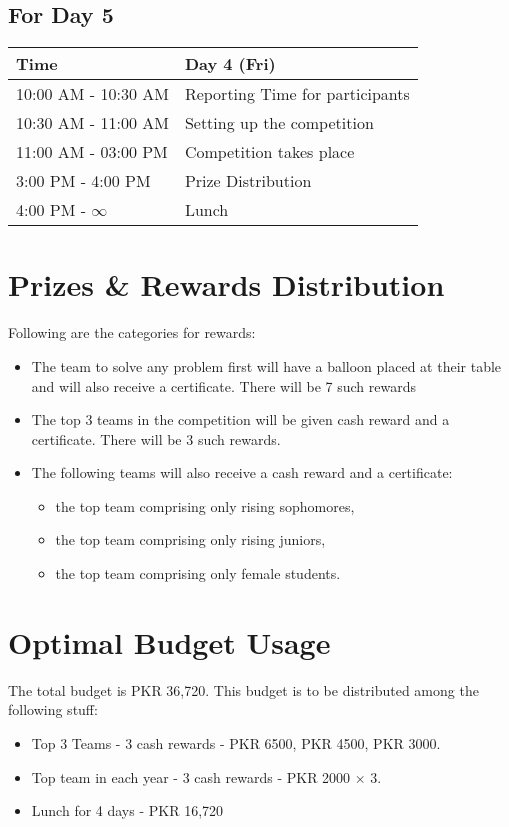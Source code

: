 \documentclass[12pt]{article}
\begin{document}
\subsection*{\centering For Day 5}
\begin{table}[H]
  \centering
  \begin{tabular}{|p{2.1cm}|p{12.9cm}|}
    \hline
    Time                & Day 4 (Fri)                     \\
    \hline
    10:00 AM - 10:30 AM & Reporting Time for participants \\
    \hline
    10:30 AM - 11:00 AM & Setting up the competition      \\
    \hline
    11:00 AM - 03:00 PM & Competition takes place         \\
    \hline
    3:00 PM - 4:00 PM   & Prize Distribution              \\
    \hline
    4:00 PM - $\infty$  & Lunch                           \\
    \hline
  \end{tabular}
\end{table}

\section*{\centering Prizes \& Rewards Distribution}
Following are the categories for rewards:
\begin{itemize}
  \item The team to solve any problem first will have a balloon placed at their table and will also receive a certificate. There will be 7 such rewards
  \item The top 3 teams in the competition will be given cash reward and a certificate. There will be 3 such rewards.
  \item The following teams will also receive a cash reward and a certificate:
        \begin{itemize}
          \item the top team comprising only rising sophomores,
          \item the top team comprising only rising juniors,
          \item the top team comprising only female students.
        \end{itemize}
\end{itemize}

\section*{\centering Optimal Budget Usage}
The total budget is PKR 36,720.
This budget is to be distributed among the following stuff:
\begin{itemize}
  \item Top 3 Teams - 3 cash rewards - PKR 6500, PKR 4500, PKR 3000.
  \item Top team in each year - 3 cash rewards - PKR 2000 $\times$ 3.
  \item Lunch for 4 days - PKR 16,720
\end{itemize}
\end{document}
